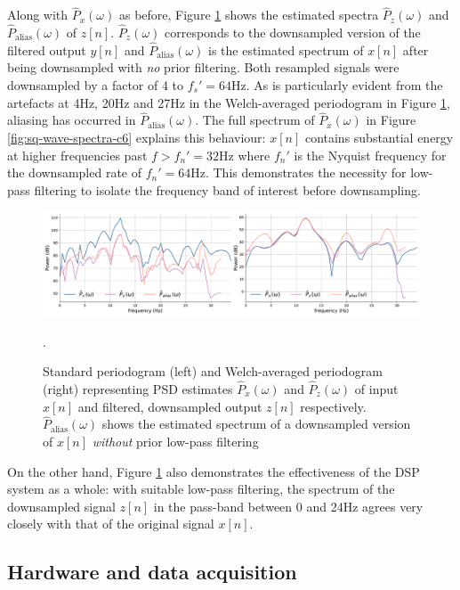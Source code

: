 Along with $\hat{P}_x(\omega)$ as before, Figure \ref{fig:sq-wave-ds-spectra-c6} shows the estimated spectra $\hat{P}_z(\omega)$ and $\hat{P}_\text{alias}(\omega)$ of $z[n]$. $\hat{P}_z(\omega)$ corresponds to the downsampled version of the filtered output $y[n]$ and $\hat{P}_\text{alias}(\omega)$ is the estimated spectrum of $x[n]$ after being downsampled with \textit{no} prior filtering. Both resampled signals were downsampled by a factor of 4 to $f_s'=64$Hz. As is particularly evident from the artefacts at 4Hz, 20Hz and 27Hz in the Welch-averaged periodogram in Figure \ref{fig:sq-wave-ds-spectra-c6}, aliasing has occurred in $\hat{P}_\text{alias}(\omega)$. The full spectrum of $\hat{P}_x(\omega)$ in Figure \ref{fig:sq-wave-spectra-c6} explains this behaviour: $x[n]$ contains substantial energy at higher frequencies past $f>f_n'=32$Hz where $f_n'$ is the Nyquist frequency for the downsampled rate of $f_n'=64$Hz. This demonstrates the necessity for low-pass filtering to isolate the frequency band of interest before downsampling. 
\begin{figure}[h]
    \centering
    \includegraphics[width=\textwidth]{sq_wave_filtering_ds_spectra}
    \caption[PSD estimates of an input signal, filtered and downsampled version and a downsampled version without filtering.]{Standard periodogram (left) and Welch-averaged periodogram (right) representing PSD estimates $\hat{P}_x(\omega)$ and $\hat{P}_z(\omega)$ of input $x[n]$ and filtered, downsampled output $z[n]$ respectively. $\hat{P}_{\text{alias}}(\omega)$ shows the estimated spectrum of a downsampled version of $x[n]$ \textit{without} prior low-pass filtering}.
    \label{fig:sq-wave-ds-spectra-c6}
\end{figure}
On the other hand, Figure \ref{fig:sq-wave-ds-spectra-c6} also demonstrates the effectiveness of the DSP system as a whole: with suitable low-pass filtering, the spectrum of the downsampled signal $z[n]$ in the pass-band between 0 and 24Hz agrees very closely with that of the original signal $x[n]$. 

\subsection{Hardware and data acquisition}

